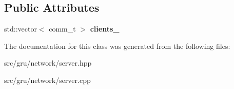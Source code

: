 \subsection*{\-Public \-Attributes}
\begin{DoxyCompactItemize}
\item 
\hypertarget{classgal_1_1network_1_1server_a4de485e44eab83025b8fd34b7b3c6928}{std\-::vector$<$ comm\-\_\-t $>$ {\bfseries clients\-\_\-}}\label{classgal_1_1network_1_1server_a4de485e44eab83025b8fd34b7b3c6928}

\end{DoxyCompactItemize}


\-The documentation for this class was generated from the following files\-:\begin{DoxyCompactItemize}
\item 
src/gru/network/server.\-hpp\item 
src/gru/network/server.\-cpp\end{DoxyCompactItemize}
